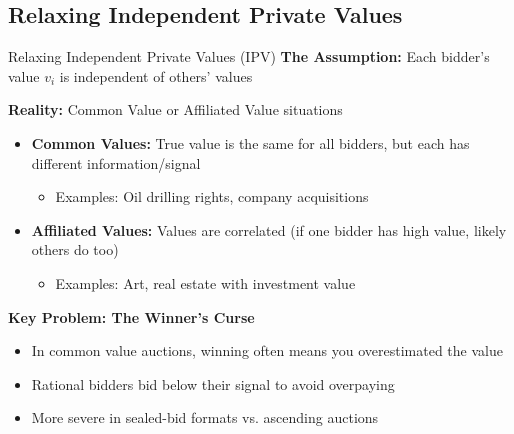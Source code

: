 \documentclass[xcolor={x11names}]{beamer}
\begin{document}
\subsection{Relaxing Independent Private Values}

\begin{frame}{Relaxing Independent Private Values (IPV)}
\textbf{The Assumption:} Each bidder's value $v_i$ is independent of others' values


\textbf{Reality:} Common Value or Affiliated Value situations
\begin{itemize}
  \item \textbf{Common Values:} True value is the same for all bidders, but each has different information/signal
  \begin{itemize}
    \item Examples: Oil drilling rights, company acquisitions
  \end{itemize}
  \item \textbf{Affiliated Values:} Values are correlated (if one bidder has high value, likely others do too)
  \begin{itemize}
    \item Examples: Art, real estate with investment value
  \end{itemize}
\end{itemize}


\textbf{Key Problem: The Winner's Curse}
\begin{itemize}
  \item In common value auctions, winning often means you overestimated the value
  \item Rational bidders bid below their signal to avoid overpaying
  \item More severe in sealed-bid formats vs. ascending auctions
\end{itemize}
\end{frame}
\end{document}
